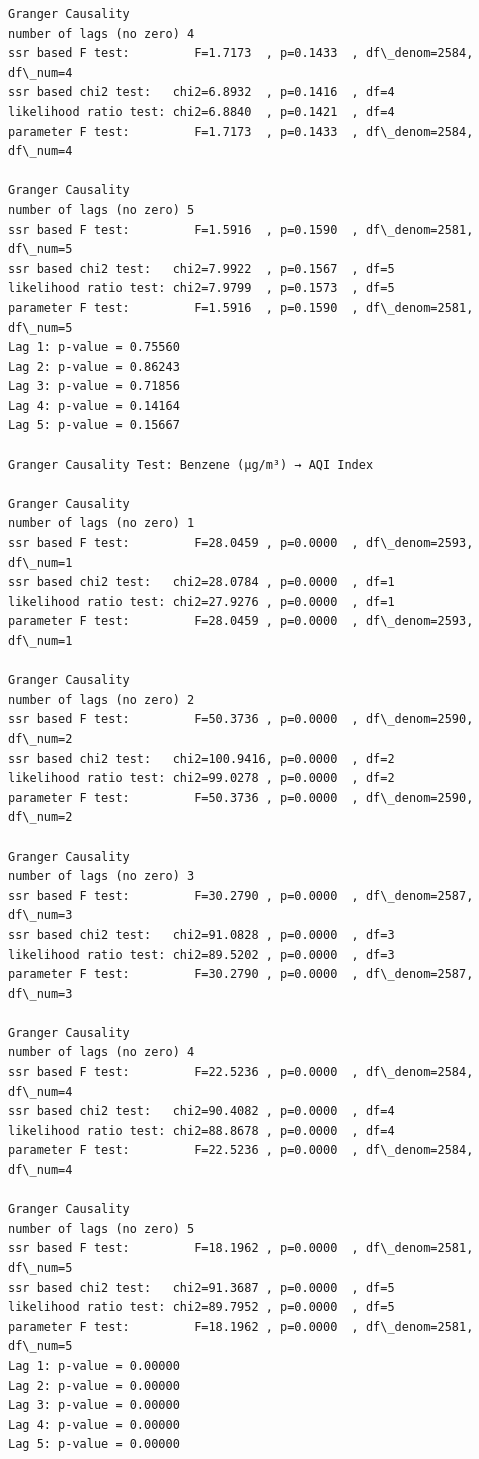 \documentclass[11pt]{article}
\begin{document}
\begin{Verbatim}[commandchars=\\\{\}]
Granger Causality
number of lags (no zero) 4
ssr based F test:         F=1.7173  , p=0.1433  , df\_denom=2584, df\_num=4
ssr based chi2 test:   chi2=6.8932  , p=0.1416  , df=4
likelihood ratio test: chi2=6.8840  , p=0.1421  , df=4
parameter F test:         F=1.7173  , p=0.1433  , df\_denom=2584, df\_num=4

Granger Causality
number of lags (no zero) 5
ssr based F test:         F=1.5916  , p=0.1590  , df\_denom=2581, df\_num=5
ssr based chi2 test:   chi2=7.9922  , p=0.1567  , df=5
likelihood ratio test: chi2=7.9799  , p=0.1573  , df=5
parameter F test:         F=1.5916  , p=0.1590  , df\_denom=2581, df\_num=5
Lag 1: p-value = 0.75560
Lag 2: p-value = 0.86243
Lag 3: p-value = 0.71856
Lag 4: p-value = 0.14164
Lag 5: p-value = 0.15667

Granger Causality Test: Benzene (µg/m³) → AQI Index

Granger Causality
number of lags (no zero) 1
ssr based F test:         F=28.0459 , p=0.0000  , df\_denom=2593, df\_num=1
ssr based chi2 test:   chi2=28.0784 , p=0.0000  , df=1
likelihood ratio test: chi2=27.9276 , p=0.0000  , df=1
parameter F test:         F=28.0459 , p=0.0000  , df\_denom=2593, df\_num=1

Granger Causality
number of lags (no zero) 2
ssr based F test:         F=50.3736 , p=0.0000  , df\_denom=2590, df\_num=2
ssr based chi2 test:   chi2=100.9416, p=0.0000  , df=2
likelihood ratio test: chi2=99.0278 , p=0.0000  , df=2
parameter F test:         F=50.3736 , p=0.0000  , df\_denom=2590, df\_num=2

Granger Causality
number of lags (no zero) 3
ssr based F test:         F=30.2790 , p=0.0000  , df\_denom=2587, df\_num=3
ssr based chi2 test:   chi2=91.0828 , p=0.0000  , df=3
likelihood ratio test: chi2=89.5202 , p=0.0000  , df=3
parameter F test:         F=30.2790 , p=0.0000  , df\_denom=2587, df\_num=3

Granger Causality
number of lags (no zero) 4
ssr based F test:         F=22.5236 , p=0.0000  , df\_denom=2584, df\_num=4
ssr based chi2 test:   chi2=90.4082 , p=0.0000  , df=4
likelihood ratio test: chi2=88.8678 , p=0.0000  , df=4
parameter F test:         F=22.5236 , p=0.0000  , df\_denom=2584, df\_num=4

Granger Causality
number of lags (no zero) 5
ssr based F test:         F=18.1962 , p=0.0000  , df\_denom=2581, df\_num=5
ssr based chi2 test:   chi2=91.3687 , p=0.0000  , df=5
likelihood ratio test: chi2=89.7952 , p=0.0000  , df=5
parameter F test:         F=18.1962 , p=0.0000  , df\_denom=2581, df\_num=5
Lag 1: p-value = 0.00000
Lag 2: p-value = 0.00000
Lag 3: p-value = 0.00000
Lag 4: p-value = 0.00000
Lag 5: p-value = 0.00000


\end{Verbatim}
\end{document}
